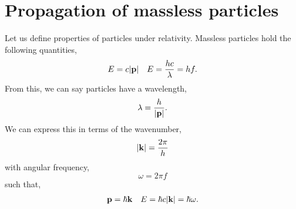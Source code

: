 \documentclass{book}
\begin{document}
\section{Propagation of massless particles}
Let us define properties of particles under relativity. Massless particles hold the following quantities,
\begin{align}
	E = c|\vb{p}| && E = \frac{hc}{\lambda} = hf. \label{energymomentum}
\end{align} 
From this, we can say particles have a wavelength,
\begin{equation}
	\lambda = \frac{h}{|\vb{p}|}.
\end{equation}
We can express this in terms of the wavenumber,
\begin{equation}
	|\vb{k}| = \frac{2\pi}{h}
\end{equation}
with angular frequency,
\begin{equation}
	\omega = 2\pi f
\end{equation}
such that,
\begin{align}
	\vb{p} = \hbar \vb{k} && E = \hbar c |\vb{k}| = \hbar \omega.
\end{align}
\end{document}
